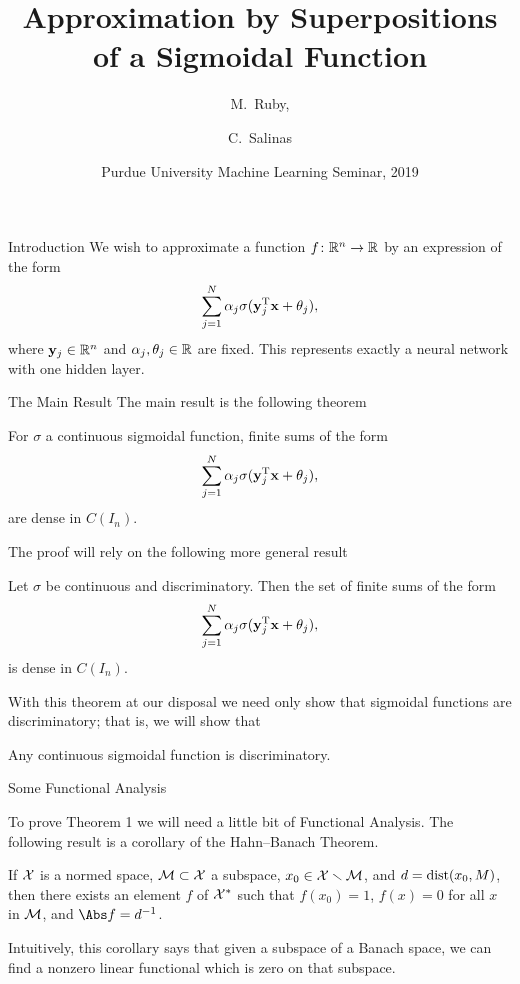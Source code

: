 \documentclass[11pt,letterpaper]{beamer}
\title[Approximation by a Sigmoidal Function] 
{Approximation by Superpositions of a Sigmoidal Function}
\author[M.\ Ruby, C.\ Salinas] 
{M.\ Ruby,%
  \and C.\ Salinas%
}
\institute[Purdue University] %
{
  Department of Mathematics\\
  Purdue University
 }
\date[Spring 2019] %
{Purdue University Machine Learning Seminar, 2019}
\begin{document}
\frame{\titlepage}

\begin{frame}{Introduction}
  We wish to approximate a function $f\colon\mathbb{R}^n\to\mathbb{R}$ by an expression of
  the form
  \begin{equation*}
    \sum_{j=1}^N \alpha_j\sigma(\mathbf{y}_j^{\mathrm{T}}\mathbf{x}+\theta_j),
  \end{equation*}
  where $\mathbf{y}_j\in\mathbb{R}^n$ and $\alpha_j,\theta_j\in\mathbb{R}$ are fixed. This represents
  exactly a neural network with one hidden layer.
\end{frame}

\begin{frame}{The Main Result}
  The main result is the following theorem
  \begin{theorem}
    For $\sigma$ a continuous sigmoidal function, finite sums of the form
    \[
      \sum_{j=1}^N \alpha_j\sigma(\mathbf{y}_j^{\mathrm{T}}\mathbf{x}+\theta_j),
    \]
    are dense in $C(I_n)$.
  \end{theorem}
\end{frame}

\begin{frame}
  The proof will rely on the following more general result
  \begin{theorem}
    Let $\sigma$ be continuous and discriminatory. Then the set of finite sums
    of the form
    \[
      \sum_{j=1}^N \alpha_j\sigma(\mathbf{y}_j^{\mathrm{T}}\mathbf{x}+\theta_j),
    \]
    is dense in $C(I_n)$.
  \end{theorem}
  With this theorem at our disposal we need only show that sigmoidal functions
  are discriminatory; that is, we will show that
    \begin{lemma}
      Any continuous sigmoidal function is discriminatory.
  \end{lemma}
\end{frame}

\begin{frame}{Some Functional Analysis}

  To prove Theorem 1 we will need a little bit of Functional Analysis. The
  following result is a corollary of the Hahn--Banach Theorem.
  \begin{corollary}[cf.\ Conway, p.\ 79]
    If $\mathcal{X}$ is a normed space, $\mathcal{M}\subset\mathcal{X}$ a subspace,
    $x_0\in\mathcal{X}\smallsetminus\mathcal{M}$, and $d=\operatorname{dist}(x_0,M)$, then there exists an
    element $f$ of $\mathcal{X}^*$ such that $f(x_0)=1$, $f(x)=0$ for all $x$ in
    $\mathcal{M}$, and $\Abs f=d^{-1}$.
  \end{corollary}
  Intuitively, this corollary says that given a subspace of a Banach space, we
  can find a nonzero linear functional which is zero on that subspace.
\end{frame}
\end{document}
